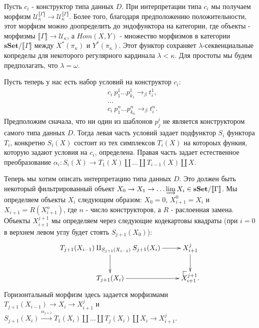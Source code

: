 \documentclass{amsart}
\makeatletter
\theoremstyle{definition}
\theoremstyle{remark}
\newcommand{\cat}[1]{\mathbf{#1}}
\newcommand{\sSet}{\cat{sSet}}
\renewcommand{\ll}{\llbracket}
\newcommand{\rr}{\rrbracket}
\numberwithin{figure}{section}
\newcommand{\po}[1][dr]{\save*!/#1+1.2pc/#1:(1,-1)@^{|-}\restore}
\makeatother
\begin{document}
Пусть $c_i$ - конструктор типа данных $D$.
При интерпретации типа $c_i$ мы получаем морфизм $\mathcal{U}_\kappa^{\ll \Gamma \rr} \to \mathcal{U}_\kappa^{\ll \Gamma \rr}$.
Более того, благодаря предположению положительности, этот морфизм можно доопределить до эндофунктора на категории, где объекты - морфизмы $\ll \Gamma \rr \to \mathcal{U}_\kappa$,
    а $Hom(X,Y)$ - множество морфизмов в категории $\sSet / \ll \Gamma \rr$ между $X^*(\pi_\kappa)$ и $Y^*(\pi_\kappa)$.
Этот функтор сохраняет $\lambda$-секвенциальные копределы для некоторого регулярного кардинала $\lambda < \kappa$.
Для простоты мы будем предполагать, что $\lambda = \omega$.

Пусть теперь у нас есть набор условий на конструктор $c_i$:
\begin{align*}
& c_i\ p^1_1 \ldots p^1_{k_1} \to_\beta t^1_i, \\
& \ldots \\
& c_i\ p^n_1 \ldots p^n_{k_n} \to_\beta t^n_i.
\end{align*}
Предположим сначала, что ни один из шаблонов $p^i_j$ не является конструктором самого типа данных $D$.
Тогда левая часть условий задает подфунктор $S_i$ функтора $T_i$, конкретно $S_i(X)$ состоит из тех симплексов $T_i(X)$ на котороых функия, которую задают условия на $c_i$, определена.
Правая часть задает естественное преобразование $\alpha_i : S_i(X) \to T_1(X) \amalg \ldots \amalg T_{i-1}(X) \amalg X$.

Теперь мы хотим описать интерпретацию типа данных $D$. Это должен быть некоторый фильтрированный объект $X_0 \to X_1 \to \ldots \varinjlim X_i \in \sSet / \ll \Gamma \rr$.
Мы определяем объекты $X_i$ следующим образом: $X_0 = 0$, $X^0_{i+1} = X_i$ и $X_{i+1} = R(X^n_{i+1})$, где $n$ - число конструкторов, а $R$ - раслоенная замена.
Объекты $X^{j+1}_{i+1}$ мы определяем через следующие кодекартовы квадраты (при $i = 0$ в верхнем левом углу будет стоять $S_{j+1}(X_0)$):
\[ \xymatrix{ T_{j+1}(X_{i-1}) \amalg_{S_{j+1}(X_{i-1})} S_{j+1}(X_i) \ar[r] \ar[d] & X^j_{i+1} \ar[d] \\
              T_{j+1}(X_i) \ar[r] & \po X^{j+1}_{i+1}.
            } \]
Горизонтальный морфизм здесь задается морфизмами $T_{j+1}(X_{i-1}) \to X_i \to X^j_{i+1}$ и $S_{j+1}(X_i) \xrightarrow{\alpha_{j+1}} T_1(X_i) \amalg \ldots \amalg T_j(X_i) \amalg X_i \to X^j_{i+1}$.



\end{document}
